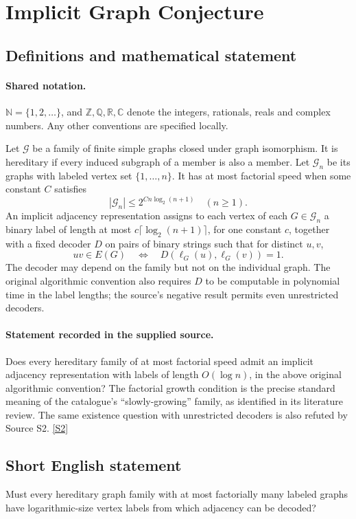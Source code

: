 \documentclass[11pt]{article}
\newcommand{\sref}[2]{\hyperlink{source:#1:#2}{[S#2]}}
\begin{document}
\section{Implicit Graph Conjecture}\label{statement}

\subsection{Definitions and mathematical statement}

\paragraph{Shared notation.}$\mathbb N=\{1,2,\ldots\}$, and $\mathbb Z,\mathbb Q,\mathbb R,\mathbb C$ denote the integers, rationals, reals and complex numbers. Any other conventions are specified locally.


Let $\mathcal G$ be a family of finite simple graphs closed under graph isomorphism. It is hereditary if every induced subgraph of a member is also a member. Let $\mathcal G_n$ be its graphs with labeled vertex set $\{1,\ldots,n\}$. It has at most factorial speed when some constant $C$ satisfies
\[
 |\mathcal G_n|\le 2^{C n\log_2(n+1)}\quad(n\ge1).
\]
An implicit adjacency representation assigns to each vertex of each $G\in\mathcal G_n$ a binary label of length at most $c\lceil\log_2(n+1)\rceil$, for one constant $c$, together with a fixed decoder $D$ on pairs of binary strings such that for distinct $u,v$,
\[
 uv\in E(G)\quad\Longleftrightarrow\quad D(\ell_G(u),\ell_G(v))=1.
\]
The decoder may depend on the family but not on the individual graph. The original algorithmic convention also requires $D$ to be computable in polynomial time in the label lengths; the source's negative result permits even unrestricted decoders.
\paragraph{Statement recorded in the supplied source.}
Does every hereditary family of at most factorial speed admit an implicit adjacency representation with labels of length $O(\log n)$, in the above original algorithmic convention? The factorial growth condition is the precise standard meaning of the catalogue's “slowly-growing” family, as identified in its literature review. The same existence question with unrestricted decoders is also refuted by Source S2. \sref{statement}{2}
\subsection{Short English statement}
Must every hereditary graph family with at most factorially many labeled graphs have logarithmic-size vertex labels from which adjacency can be decoded?
\end{document}
